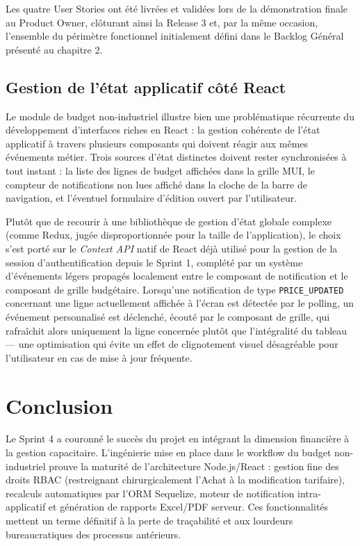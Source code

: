 Les quatre User Stories ont été livrées et validées lors de la démonstration finale au Product Owner, clôturant ainsi la Release 3 et, par la même occasion, l'ensemble du périmètre fonctionnel initialement défini dans le Backlog Général présenté au chapitre 2.

\subsection{Gestion de l'état applicatif côté React}
Le module de budget non-industriel illustre bien une problématique récurrente du développement d'interfaces riches en React : la gestion cohérente de l'état applicatif à travers plusieurs composants qui doivent réagir aux mêmes événements métier. Trois sources d'état distinctes doivent rester synchronisées à tout instant : la liste des lignes de budget affichées dans la grille MUI, le compteur de notifications non lues affiché dans la cloche de la barre de navigation, et l'éventuel formulaire d'édition ouvert par l'utilisateur.

Plutôt que de recourir à une bibliothèque de gestion d'état globale complexe (comme Redux, jugée disproportionnée pour la taille de l'application), le choix s'est porté sur le \textit{Context API} natif de React déjà utilisé pour la gestion de la session d'authentification depuis le Sprint 1, complété par un système d'événements légers propagés localement entre le composant de notification et le composant de grille budgétaire. Lorsqu'une notification de type \texttt{PRICE\_UPDATED} concernant une ligne actuellement affichée à l'écran est détectée par le polling, un événement personnalisé est déclenché, écouté par le composant de grille, qui rafraîchit alors uniquement la ligne concernée plutôt que l'intégralité du tableau — une optimisation qui évite un effet de clignotement visuel désagréable pour l'utilisateur en cas de mise à jour fréquente.

\section{Conclusion}
Le Sprint 4 a couronné le succès du projet en intégrant la dimension financière à la gestion capacitaire. L'ingénierie mise en place dans le workflow du budget non-industriel prouve la maturité de l'architecture Node.js/React : gestion fine des droits RBAC (restreignant chirurgicalement l'Achat à la modification tarifaire), recalculs automatiques par l'ORM Sequelize, moteur de notification intra-applicatif et génération de rapports Excel/PDF serveur. Ces fonctionnalités mettent un terme définitif à la perte de traçabilité et aux lourdeurs bureaucratiques des processus antérieurs.

